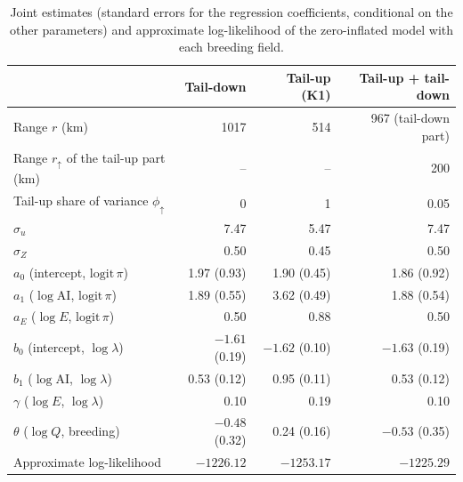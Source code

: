 \documentclass[11pt,a4paper]{article}
\newcommand{\AI}{\mathrm{AI}}
\begin{document}
\begin{table}[H]
\centering
\caption{Joint estimates (standard errors for the regression coefficients, conditional on the other parameters) and approximate log-likelihood of the zero-inflated model with each breeding field.}
\label{tab:estimates}
\begin{tabular}{lrrr}
\toprule
 & Tail-down & Tail-up (K1) & Tail-up + tail-down \\
\midrule
Range $r$ (km) & 1017 & 514 & 967 (tail-down part) \\
Range $r_\uparrow$ of the tail-up part (km) & -- & -- & 200 \\
Tail-up share of variance $\phi_\uparrow$ & 0 & 1 & 0.05 \\
$\sigma_u$ & 7.47 & 5.47 & 7.47 \\
$\sigma_Z$ & 0.50 & 0.45 & 0.50 \\
\midrule
$a_0$ (intercept, $\mathrm{logit}\,\pi$) & 1.97 (0.93) & 1.90 (0.45) & 1.86 (0.92) \\
$a_1$ ($\log\AI$, $\mathrm{logit}\,\pi$) & 1.89 (0.55) & 3.62 (0.49) & 1.88 (0.54) \\
$a_E$ ($\log E$, $\mathrm{logit}\,\pi$) & 0.50 & 0.88 & 0.50 \\
$b_0$ (intercept, $\log\lambda$) & $-1.61$ (0.19) & $-1.62$ (0.10) & $-1.63$ (0.19) \\
$b_1$ ($\log\AI$, $\log\lambda$) & 0.53 (0.12) & 0.95 (0.11) & 0.53 (0.12) \\
$\gamma$ ($\log E$, $\log\lambda$) & 0.10 & 0.19 & 0.10 \\
$\theta$ ($\log Q$, breeding) & $-0.48$ (0.32) & 0.24 (0.16) & $-0.53$ (0.35) \\
\midrule
Approximate log-likelihood & $-1226.12$ & $-1253.17$ & $-1225.29$ \\
\bottomrule
\end{tabular}
\end{table}
\end{document}
